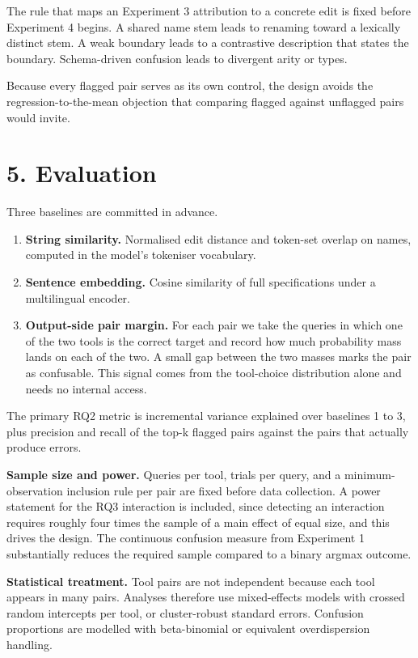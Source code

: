 \documentclass[11pt,a4paper]{article}
\begin{document}
The rule that maps an Experiment 3 attribution to a concrete edit is fixed before Experiment 4 begins. A
shared name stem leads to renaming toward a lexically distinct stem. A weak boundary leads to a
contrastive description that states the boundary. Schema-driven confusion leads to divergent arity
or types.

Because every flagged pair serves as its own control, the design avoids the
regression-to-the-mean objection that comparing flagged against unflagged pairs would invite.

\section*{5. Evaluation}

Three baselines are committed in advance.

\begin{enumerate}
    \item \textbf{String similarity.} Normalised edit distance and token-set overlap on names, computed in
    the model's tokeniser vocabulary.
    \item \textbf{Sentence embedding.} Cosine similarity of full specifications under a multilingual encoder.
    \item \textbf{Output-side pair margin.} For each pair we take the queries in which one of the two tools
    is the correct target and record how much probability mass lands on each of the two. A small
    gap between the two masses marks the pair as confusable. This signal comes from the
    tool-choice distribution alone and needs no internal access.
\end{enumerate}

The primary RQ2 metric is incremental variance explained over baselines 1 to 3, plus precision
and recall of the top-k flagged pairs against the pairs that actually produce errors.

\textbf{Sample size and power.} Queries per tool, trials per query, and a minimum-observation
inclusion rule per pair are fixed before data collection. A power statement for the RQ3
interaction is included, since detecting an interaction requires roughly four times the sample of
a main effect of equal size, and this drives the design. The continuous confusion measure from
Experiment 1 substantially reduces the required sample compared to a binary argmax outcome.

\textbf{Statistical treatment.} Tool pairs are not independent because each tool appears in many
pairs. Analyses therefore use mixed-effects models with crossed random intercepts per tool, or
cluster-robust standard errors. Confusion proportions are modelled with beta-binomial or
equivalent overdispersion handling.
\end{document}
